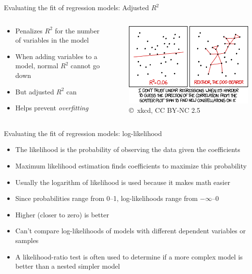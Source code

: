 \begin{frame}{Evaluating the fit of regression models: Adjusted $R^2$}
  \begin{columns}
    \begin{column}{0.65\textwidth}
      \begin{itemize}
        \item Penalizes $R^2$ for the number of variables in the model
        \item When adding variables to a model, normal $R^2$ cannot go down
        \item But adjusted $R^2$ can
        \item Helps prevent \emph{overfitting}
      \end{itemize}
    \end{column}~%
    \begin{column}{0.34\textwidth}
      \includegraphics[width=\textwidth]{xkcd_linear_regression.png}\\
      {\tiny \copyright~xkcd, CC BY-NC 2.5}
    \end{column}
  \end{columns}
\end{frame}

\begin{frame}{Evaluating the fit of regression models: log-likelihood}
  \begin{itemize}
    \item The likelihood is the probability of observing the data given the coefficients
    \item Maximum likelihood estimation finds coefficients to maximize this probability
    \item Usually the logarithm of likelihood is used because it makes math easier
    \item Since probabilities range from 0--1, log-likelihoods range from $-\infty$--0
    \item Higher (closer to zero) is better
    \item Can't compare log-likelihoods of models with different dependent variables or samples
    \item A likelihood-ratio test is often used to determine if a more complex model is better than a nested simpler model
  \end{itemize}
\end{frame}


